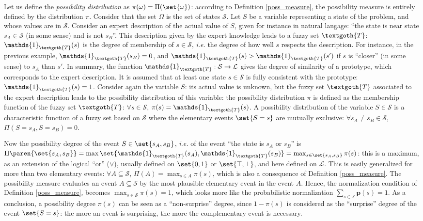 Let us define the \textit{possibility distribution} as $\pi(\omega) = \Pi(\set{\omega})$:
according to Definition \ref{poss_measure},
the possibility measure is entirely defined by the distribution $\pi$.
Consider that the set $\Omega$ is the set of states $\mathcal{S}$.
Let $S$ be a variable representing a state of the problem, 
and whose values are in $\mathcal{S}$.
Consider an expert description of the actual value of $S$,
given for instance in natural langage: ``the state is near state $s_A \in \mathcal{S}$ (in some sense)
and is not $s_B$''.
This description given by the expert knowledge leads to a fuzzy set $\textgoth{T}$:
$\mathds{1}_{\textgoth{T}}(s)$ is the degree of membership of $s \in \mathcal{S}$,
\textit{i.e.} the degree of how well $s$ respects the description.
For instance, in the previous example, $\mathds{1}_{\textgoth{T}}(s_B) = 0$,
and $\mathds{1}_{\textgoth{T}}(s)  > \mathds{1}_{\textgoth{T}}(s')$
if $s$ is ``closer'' (in some sense) to $s_A$ than $s'$.
In summary, 
the function $\mathds{1}_{\textgoth{T}}: \mathcal{S} \rightarrow \mathcal{L}$ 
gives the degree of similarity of a prototype,
which corresponds to the expert description.
It is assumed that at least one state $s \in \mathcal{S}$
is fully consistent with the prototype: $\mathds{1}_{\textgoth{T}}(s) =1$.
Consider again the variable $S$:
its actual value is unknown, 
but the fuzzy set $\textgoth{T}$ associated to the expert description
leads to the possibility distribution of this variable:
the possibility distribution $\pi$ is defined as the membership function
of the fuzzy set $\textgoth{T}$:
$\forall s \in \mathcal{S}$, $\pi(s) = \mathds{1}_{\textgoth{T}}(s)$.
A possibility distribution of the variable $S \in \mathcal{S}$ 
is a characteristic function of a fuzzy set based on $\mathcal{S}$
where the elementary events $\set{ S = s }$ are mutually exclusive:
$\forall s_A \neq s_B \in \mathcal{S}$, $\Pi(S = s_A,  S = s_B) = 0$.
 
Now the possibility degree of the event $S \in \set{s_A,s_B}$,
\textit{i.e.} of the event ``the state is $s_A$ or $s_B$''
is $\Pi\paren{\set{ s_A,s_B }} = \max \set{ \mathds{1}_{\textgoth{T}}(s_A), \mathds{1}_{\textgoth{T}}(s_B) } = \max_{ s \in \set{ s_A,s_B } } \pi(s)$:
this is a maximum, as an extension of the logical ``or'' ($\vee$), 
usually defined on $\set{0,1}$ or $\set{ \top, \bot }$,
and here defined on $\mathcal{L}$.
This is easily generalized for more than two elementary events:
$\forall A \subseteq \mathcal{S}$, $\Pi(A) = \max_{s \in A} \pi(s)$,
which is also a consequence of Definition \ref{poss_measure}.
The possibility measure evaluates an event $A \subseteq \mathcal{S}$
by the most plausible elementary event in the event $A$.
Hence, the normalization condition of Definition \ref{poss_measure},
becomes $\max_{s \in \mathcal{S}} \pi(s) = 1$, 
which looks more like the probabilistic normalization $\sum_{s \in \mathcal{S}} \textbf{p}(s)=1$.
As a conclusion, a possibility degree $\pi(s)$ can be seen as a ``non-surprise'' degree,
since $1 - \pi(s)$ is considered as the ``surprise'' degree of the event $\set{S = s}$:
the more an event is surprising, the more the complementary event is necessary.

